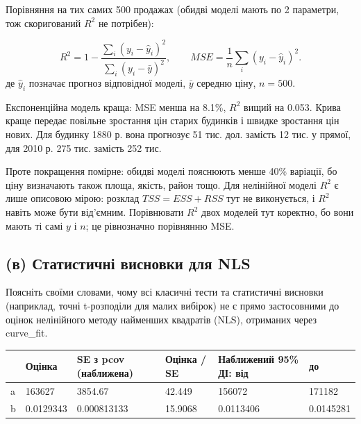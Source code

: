 Порівняння на тих самих 500 продажах (обидві моделі мають по 2
параметри, тож скоригований \(R^2\) не потрібен):

\[R^2=1-\frac{\sum_i(y_i-\widehat y_i)^2}{\sum_i(y_i-\bar y)^2},\qquad MSE=\frac1n\sum_i(y_i-\widehat y_i)^2.\]
де \(\widehat y_i\) позначає прогноз відповідної моделі, \(\bar y\)
середню ціну, \(n=500\).

Експоненційна модель краща: MSE менша на 8.1\%, \(R^2\) вищий на 0.053.
Крива краще передає повільне зростання цін старих будинків і швидке
зростання цін нових. Для будинку 1880 р. вона прогнозує 51 тис. дол.
замість 12 тис. у прямої, для 2010 р. 275 тис. замість 252 тис.

Проте покращення помірне: обидві моделі пояснюють менше 40\% варіації,
бо ціну визначають також площа, якість, район тощо. Для нелінійної
моделі \(R^2\) є лише описовою мірою: розклад \(TSS=ESS+RSS\) тут не
виконується, і \(R^2\) навіть може бути від'ємним. Порівнювати \(R^2\)
двох моделей тут коректно, бо вони мають ті самі \(y\) і \(n\); це
рівнозначно порівнянню MSE.


\Needspace{186.0pt}

\subsection{(в) Статистичні висновки для NLS}

\begin{taskstatement}
Поясніть своїми словами, чому всі класичні тести та статистичні висновки
(наприклад, точні t-розподіли для малих вибірок) не є прямо застосовними
до оцінок нелінійного методу найменших квадратів (NLS), отриманих через
curve\_fit.
\end{taskstatement}



\begingroup\fontsize{7.5}{9.5}\selectfont\setlength{\tabcolsep}{2.5mm}\renewcommand{\arraystretch}{1.15}
\par\vspace{2pt}\noindent\begin{tabular}{|llllll|}
\hline
 & Оцінка & SE з pcov (наближена) & Оцінка / SE & Наближений 95\% ДІ: від & до \\
\hline
a & 163627 & 3854.67 & 42.449 & 156072 & 171182 \\
b & 0.0129343 & 0.000813133 & 15.9068 & 0.0113406 & 0.0145281 \\
\hline
\end{tabular}\par\vspace{2pt}
\endgroup


